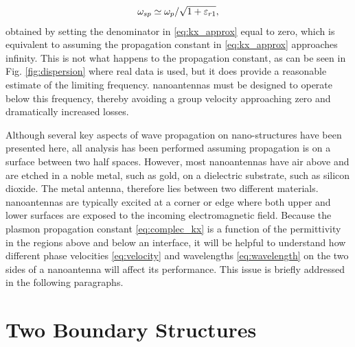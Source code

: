 \documentclass[11pt]{article}
\begin{document}
%
\begin{equation}
  \omega_{sp} \simeq \omega_p/\sqrt{1 + \varepsilon_{r1}},
  \label{eq:apprx_plasma_freq}
\end{equation}
%
obtained by setting the denominator in \eqref{eq:kx_approx} equal to zero, which is equivalent to assuming the propagation constant in \eqref{eq:kx_approx} approaches infinity. This is not what happens to the propagation constant, as can be seen in Fig. \ref{fig:dispersion} where real data is used, but it does provide a reasonable estimate of the limiting frequency. nanoantennas must be designed to operate below this frequency, thereby avoiding a group velocity approaching zero and dramatically increased losses.

Although several key aspects of wave propagation on nano-structures have been presented here, all analysis has been performed assuming propagation is on a surface between two half spaces. However, most nanoantennas have air above and are etched in a noble metal, such as gold, on a dielectric substrate, such as silicon dioxide. The metal antenna, therefore lies between two different materials. nanoantennas are typically excited at a corner or edge where both upper and lower surfaces are exposed to the incoming electromagnetic field. Because the plasmon propagation constant \eqref{eq:complec_kx} is a function of the permittivity in the regions above and below an interface, it will be helpful to understand how different phase velocities \eqref{eq:velocity} and wavelengths \eqref{eq:wavelength} on the two sides of a nanoantenna will affect its performance. This issue is briefly addressed in the following paragraphs.

\section{Two Boundary Structures}
\end{document}
